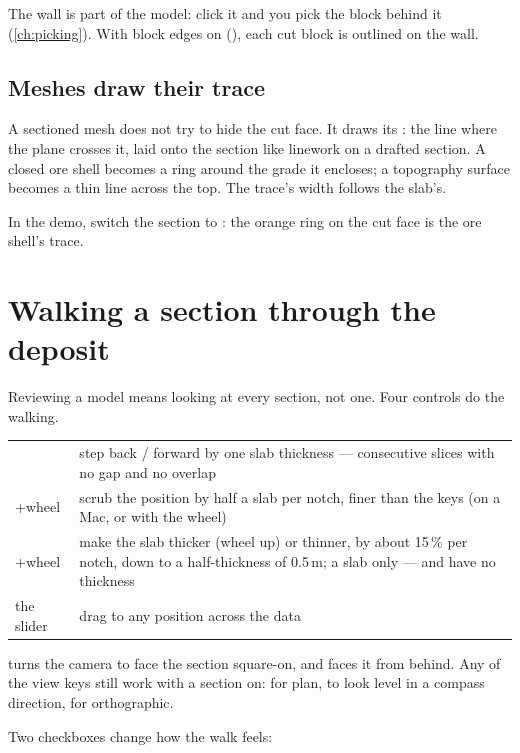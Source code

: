 The wall is part of the model: click it and you pick the block behind it (\cref{ch:picking}). With block edges on (), each cut block is outlined on the wall.

\subsection{Meshes draw their trace}
A sectioned mesh does not try to hide the cut face. It draws its : the line where the plane crosses it, laid onto the section like linework on a drafted section. A closed ore shell becomes a ring around the grade it encloses; a topography surface becomes a thin line across the top. The trace's width follows the slab's.

In the demo, switch the section to : the orange ring on the cut face is the ore shell's trace.

\section{Walking a section through the deposit}\label{sec:sections-walk}
Reviewing a model means looking at every section, not one. Four controls do the walking.

\begin{center}
\begin{tabularx}{\linewidth}{@{}lL@{}}\toprule
\key{,}  & step back / forward by one slab thickness — consecutive slices with no gap and no overlap \\
+wheel & scrub the position by half a slab per notch, finer than the keys (on a Mac,  or  with the wheel) \\
+wheel & make the slab thicker (wheel up) or thinner, by about 15\,\% per notch, down to a half-thickness of 0.5\,m; a slab only —  and  have no thickness \\
the slider & drag to any position across the data \\ \bottomrule
\end{tabularx}
\end{center}

 turns the camera to face the section square-on, and  faces it from behind. Any of the view keys still work with a section on:  for plan,     to look level in a compass direction,  for orthographic.

Two checkboxes change how the walk feels:

